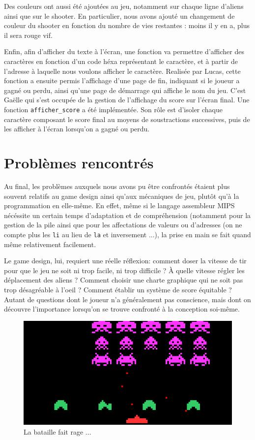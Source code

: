 \documentclass[a4paper,12pt]{report}
\begin{document}
Des couleurs ont aussi été ajoutées au jeu, notamment sur chaque ligne d'aliens ainsi que sur le shooter.
En particulier, nous avons ajouté un changement de couleur du shooter en fonction du nombre de vies restantes : moins il y en a, plus il sera rouge vif.\par
\vskip 0.75cm
Enfin, afin d’afficher du texte à l’écran, une fonction va permettre d’afficher des caractères en fonction d’un code héxa représentant le caractère, et à partir de l’adresse à laquelle nous voulons afficher le caractère. Realisée par Lucas, cette fonction a ensuite permis l’affichage d’une page de fin, indiquant si le joueur a gagné ou perdu, ainsi qu’une page de démarrage qui affiche le nom du jeu.
C'est Gaëlle qui s'est occupée de la gestion de l'affichage du score sur l'écran final.
Une fonction \texttt{afficher\_score} a été implémentée. Son rôle est d'isoler chaque caractère composant le score final au moyens de soustractions successives, puis de les afficher à l'écran lorsqu'on a gagné ou perdu.\par

\section*{Problèmes rencontrés}

Au final, les problèmes auxquels nous avons pu être confrontés étaient plus souvent relatifs au game design ainsi qu'aux mécaniques de jeu, plutôt qu'à la programmation en elle-même. En effet, même si le langage assembleur MIPS nécéssite un certain temps d'adaptation et de compréhension (notamment pour la gestion de la pile ainsi que pour les affectations de valeurs ou d'adresses (on ne compte plus les \texttt{li} au lieu de \texttt{la} et inversement ...), la prise en main se fait quand même relativement facilement.\par
\vskip 0.75cm
Le game design, lui, requiert une réelle réflexion: comment doser la vitesse de tir pour que le jeu ne soit ni trop facile, ni trop difficile ? À quelle vitesse régler les déplacement des aliens ? Comment choisir une charte graphique qui ne soit pas trop désagréable à l'oeil ? Comment établir un système de score équitable ?
Autant de questions dont le joueur n'a généralement pas conscience, mais dont on découvre l'importance lorsqu'on se trouve confronté à la conception soi-même.\par

\vskip 3cm
\begin{figure}[h!]
  \centering
  \includegraphics[scale=0.6]{invader}
  \caption*{La bataille fait rage ...}
\end{figure}
\end{document}
